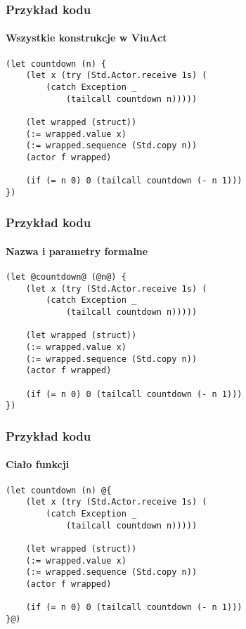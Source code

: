 \documentclass{beamer}
\begin{document}
\begin{frame}[fragile]
    \frametitle{Przykład kodu}
    \framesubtitle{Wszystkie konstrukcje w ViuAct}

    \begin{small}
    \begin{lstlisting}
(let countdown (n) {
    (let x (try (Std.Actor.receive 1s) (
        (catch Exception _
            (tailcall countdown n)))))

    (let wrapped (struct))
    (:= wrapped.value x)
    (:= wrapped.sequence (Std.copy n))
    (actor f wrapped)

    (if (= n 0) 0 (tailcall countdown (- n 1)))
})
    \end{lstlisting}
    \end{small}
\end{frame}

\begin{frame}[fragile]
    \frametitle{Przykład kodu}
    \framesubtitle{Nazwa i parametry formalne}

    \begin{small}
    \begin{lstlisting}
(let @countdown@ (@n@) {
    (let x (try (Std.Actor.receive 1s) (
        (catch Exception _
            (tailcall countdown n)))))

    (let wrapped (struct))
    (:= wrapped.value x)
    (:= wrapped.sequence (Std.copy n))
    (actor f wrapped)

    (if (= n 0) 0 (tailcall countdown (- n 1)))
})
    \end{lstlisting}
    \end{small}
\end{frame}

\begin{frame}[fragile]
    \frametitle{Przykład kodu}
    \framesubtitle{Ciało funkcji}

    \begin{small}
    \begin{lstlisting}
(let countdown (n) @{
    (let x (try (Std.Actor.receive 1s) (
        (catch Exception _
            (tailcall countdown n)))))

    (let wrapped (struct))
    (:= wrapped.value x)
    (:= wrapped.sequence (Std.copy n))
    (actor f wrapped)

    (if (= n 0) 0 (tailcall countdown (- n 1)))
}@)
    \end{lstlisting}
    \end{small}
\end{frame}
\end{document}
